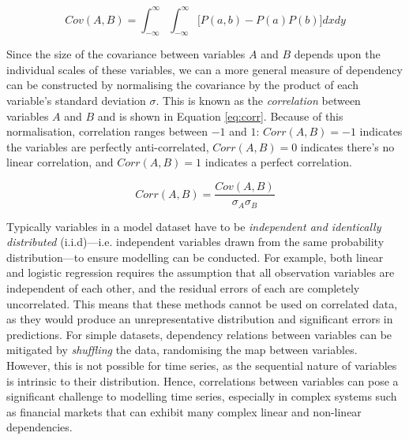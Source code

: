\documentclass[a4paper, 11pt]{article}
\begin{document}
    \begin{equation}
        Cov(A, B) = \int_{-\infty}^{\infty} \int_{-\infty}^{\infty} \big[P \left(a, b \right) - P\left(a\right) P\left(b\right) \big] dxdy
        \label{eq:cov}
    \end{equation}

    Since the size of the covariance between variables $A$ and $B$ depends upon the individual scales of these variables, we can a more general measure of dependency can be constructed by normalising the covariance by the product of each variable's standard deviation $\sigma$. This is known as the \emph{correlation} between variables $A$ and $B$ and is shown in Equation \ref{eq:corr}. Because of this normalisation, correlation ranges between $-1$ and $1$: $Corr(A, B) = -1$ indicates the variables are perfectly anti-correlated, $Corr(A, B) = 0$ indicates there's no linear correlation, and $Corr(A, B) = 1$ indicates a perfect correlation.

    \begin{equation}
        Corr(A, B) = \frac{Cov(A, B)}{\sigma_A \sigma_B}
        \label{eq:corr}
    \end{equation}

    Typically variables in a model dataset have to be \emph{independent and identically distributed} (i.i.d)---i.e. independent variables drawn from the same probability distribution---to ensure modelling can be conducted. For example, both linear and logistic regression requires the assumption that all observation variables are independent of each other, and the residual errors of each are completely uncorrelated. This means that these methods cannot be used on correlated data, as they would produce an unrepresentative distribution and significant errors in predictions. For simple datasets, dependency relations between variables can be mitigated by \emph{shuffling} the data, randomising the map between variables. However, this is not possible for time series, as the sequential nature of variables is intrinsic to their distribution. Hence, correlations between variables can pose a significant challenge to modelling time series, especially in complex systems such as financial markets that can exhibit many complex linear and non-linear dependencies. 
\end{document}
